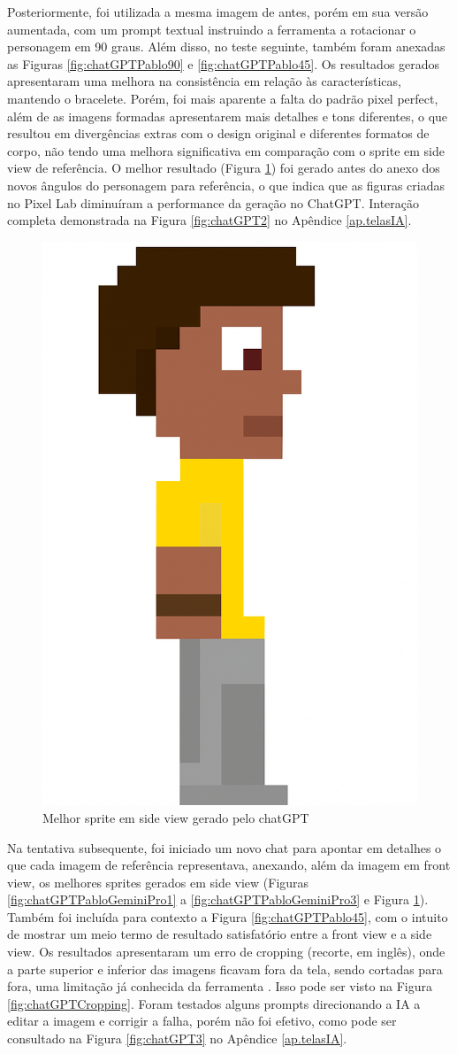 Posteriormente, foi utilizada a mesma imagem de antes, porém em sua versão aumentada, com um prompt textual instruindo a ferramenta a rotacionar o personagem em 90 graus. Além disso, no teste seguinte, também foram anexadas as Figuras \ref{fig:chatGPTPablo90} e \ref{fig:chatGPTPablo45}. Os resultados gerados apresentaram uma melhora na consistência em relação às características, mantendo o bracelete. Porém, foi mais aparente a falta do padrão pixel perfect, além de as imagens formadas apresentarem mais detalhes e tons diferentes, o que resultou em divergências extras com o design original e diferentes formatos de corpo, não tendo uma melhora significativa em comparação com o sprite em side view de referência. O melhor resultado (Figura \ref{fig:chatGPTSideView}) foi gerado antes do anexo dos novos ângulos do personagem para referência, o que indica que as figuras criadas no Pixel Lab diminuíram a performance da geração no ChatGPT. Interação completa demonstrada na Figura \ref{fig:chatGPT2} no Apêndice \ref{ap.telasIA}. 

\begin{figure}[htbp]
    \centering
    \caption{\small Melhor sprite em side view gerado pelo chatGPT }
    \label{fig:chatGPTSideView}
    \includegraphics[width=0.3\linewidth]{figs/chatGPT/visao_lateral/res1.png}
\end{figure}

Na tentativa subsequente, foi iniciado um novo chat para apontar em detalhes o que cada imagem de referência representava, anexando, além da imagem em front view, os melhores sprites gerados em side view (Figuras \ref{fig:chatGPTPabloGeminiPro1} a \ref{fig:chatGPTPabloGeminiPro3} e Figura \ref{fig:chatGPTSideView}). Também foi incluída para contexto a Figura \ref{fig:chatGPTPablo45}, com o intuito de mostrar um meio termo de resultado satisfatório entre a front view e a side view. Os resultados apresentaram um erro de cropping (recorte, em inglês), onde a parte superior e inferior das imagens ficavam fora da tela, sendo cortadas para fora, uma limitação já conhecida da ferramenta \cite{openaiImage_2025}. Isso pode ser visto na Figura \ref{fig:chatGPTCropping}. Foram testados alguns prompts direcionando a IA a editar a imagem e corrigir a falha, porém não foi efetivo, como pode ser consultado na Figura \ref{fig:chatGPT3} no Apêndice \ref{ap.telasIA}.

